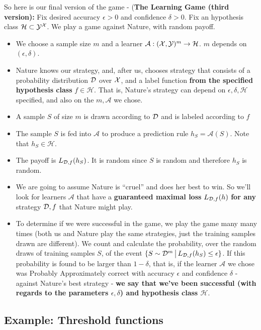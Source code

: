 \documentclass[11pt]{article}
\newcommand{\Ac}{\mathcal{A}}
\newcommand{\Hc}{\mathcal{H}}
\begin{document}
 So here is our final version of the game - ({\bf The Learning Game (third
   version):} Fix desired accuracy $\epsilon>0$ and confidence $\delta>0$. Fix
   an hypothesis class $\Hc \subset \Y^\X$. 
 We play a game against Nature, with random payoff.
  \begin{itemize}
    \item We choose a sample size $m$ and a learner $\Ac:(\X,\Y)^m \to \Hc$. 
    $m$ depends on $(\epsilon,\delta)$.
       \item Nature knows our strategy, and, after us, chooses strategy that consists of a probability distribution $\mathcal{D}$ over $\mathcal{X}$, and a label function {\bf from the specified hypothesis class} $f\in\Hc$. 
     That is, Nature's strategy can depend on $\epsilon,\delta,\Hc$ specified, and also on the $m,\Ac$ we chose. 
    \item A sample $S$ of size $m$ is drawn according to $\mathcal{D}$ and is labeled
      according to $f$
    \item The sample $S$ is fed into $\Ac$ to produce a prediction rule
      $h_S=\Ac(S)$. Note that $h_S\in\Hc$.
    \item The payoff is $L_{\mathcal{D},f}(h_S)$. It is random since $S$ is random and
      therefore $h_S$ is random.
    \item We are going to assume Nature is ``cruel'' and does her best to win.
      So we'll look for learners $\Ac$ that have a {\bf guaranteed maximal 
      loss} $L_{\mathcal{D},f}(h)$ {\bf for any} strategy $\mathcal{D},f$ that Nature might play.
      \item To determine if we were successful in the game, we play the game many many times 
      (both us and Nature play the same strategies, just the training samples drawn are different).
      We count and calculate the probability, over the random draws of training samples $S$, of the event
      $\{ S \sim \mathcal{D}^m \,\big |\,L_{\mathcal{D},f}(h_S)\leq \epsilon \}$. If this probability is found to be 
      larger than $1-\delta$, that is, if 
      the learner $\Ac$ we chose was Probably Approximately correct with accuracy $\epsilon$ and confidence $\delta$ - against Nature's best strategy - {\bf we say that we've been successful (with regards to the parameters $\epsilon,\delta$) and hypothesis class $\Hc$}.
\end{itemize}


\subsection{Example: Threshold functions}
\end{document}
